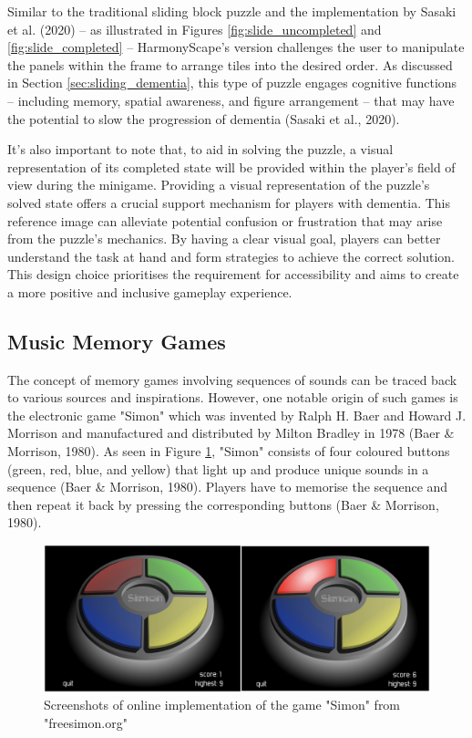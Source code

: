 \documentclass{l4proj}
\begin{document}
Similar to the traditional sliding block puzzle and the implementation by Sasaki et al. (2020) – as illustrated in Figures \ref{fig:slide_uncompleted} and \ref{fig:slide_completed} – HarmonyScape's version challenges the user to manipulate the panels within the frame to arrange tiles into the desired order. As discussed in Section \ref{sec:sliding_dementia}, this type of puzzle engages cognitive functions – including memory, spatial awareness, and figure arrangement – that may have the potential to slow the progression of dementia (Sasaki et al., 2020).

It's also important to note that, to aid in solving the puzzle, a visual representation of its completed state will be provided within the player's field of view during the minigame. Providing a visual representation of the puzzle's solved state offers a crucial support mechanism for players with dementia. This reference image can alleviate potential confusion or frustration that may arise from the puzzle's mechanics. By having a clear visual goal, players can better understand the task at hand and form strategies to achieve the correct solution. This design choice prioritises the requirement for accessibility and aims to create a more positive and inclusive gameplay experience.

\subsection{Music Memory Games}
The concept of memory games involving sequences of sounds can be traced back to various sources and inspirations. However, one notable origin of such games is the electronic game "Simon" which was invented by Ralph H. Baer and Howard J. Morrison and manufactured and distributed by Milton Bradley in 1978 (Baer \& Morrison, 1980). As seen in Figure \ref{fig:simon}, "Simon" consists of four coloured buttons (green, red, blue, and yellow) that light up and produce unique sounds in a sequence (Baer \& Morrison, 1980). Players have to memorise the sequence and then repeat it back by pressing the corresponding buttons (Baer \& Morrison, 1980).

\begin{figure}[h]
    \centering
    \includegraphics[width=1.0\linewidth]{dissertation/images/simon.jpg}    

    \caption{Screenshots of online implementation of the game "Simon" from "freesimon.org"
    }

    \label{fig:simon} 
\end{figure}
\end{document}
